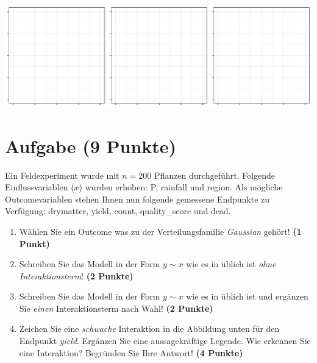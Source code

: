 \documentclass[a4paper, 10pt]{scrartcl}\usepackage[]{graphicx}\usepackage[]{xcolor}
\makeatletter
\def\maxwidth{ %
  \ifdim\Gin@nat@width>\linewidth
    \linewidth
  \else
    \Gin@nat@width
  \fi
}
\makeatother
\begin{document}
{\centering \includegraphics[width=\maxwidth]{img/regression-01-1} 

}



 
\clearpage

\section{Aufgabe \hfill (9 Punkte)}



Ein Feldexperiment wurde mit $n = 200$ Pflanzen durchgef{\"u}hrt. Folgende
Einflussvariablen ($x$) wurden erhoben: P, rainfall und region. Als m{\"o}gliche Outcomevariablen stehen Ihnen nun
folgende gemessene Endpunkte zu Verf{\"u}gung: drymatter, yield, count, quality\_score und dead.

\begin{enumerate}
\item W{\"a}hlen Sie ein Outcome was zu der Verteilungsfamilie
  \textit{Gaussian} geh{\"o}rt! \textbf{(1 Punkt)}
\item Schreiben Sie das Modell in der Form $y \sim x$ wie es in \Rlogo
  {\"u}blich ist \textit{ohne Interaktionsterm}! \textbf{(2 Punkte)}
\item Schreiben Sie das Modell in der Form $y \sim x$ wie es in \Rlogo
  {\"u}blich ist und erg{\"a}nzen Sie \textit{einen} Interaktionsterm nach Wahl! \textbf{(2 Punkte)} 
\item Zeichen Sie eine \textit{schwache}
  Interaktion in die Abbildung unten f{\"u}r den Endpunkt
  \textit{yield}. Erg{\"a}nzen Sie eine aussagekr{\"a}ftige Legende. Wie erkennen
  Sie eine Interaktion? Begr{\"u}nden Sie Ihre Antwort! \textbf{(4 Punkte)}
\end{enumerate}
\end{document}
